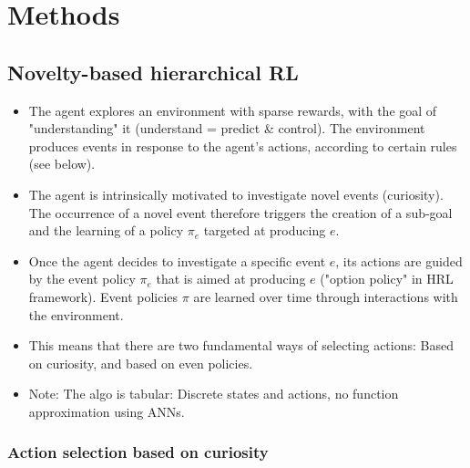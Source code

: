 \documentclass{article}
\begin{document}
\section{Methods}

\subsection{Novelty-based hierarchical RL}

\begin{itemize}
	\item The agent explores an environment with sparse rewards, with the goal of "understanding" it (understand = predict \& control). The environment produces events in response to the agent's actions, according to certain rules (see below).
	\item The agent is intrinsically motivated to investigate novel events (curiosity). The occurrence of a novel event therefore triggers the creation of a sub-goal and the learning of a policy $\pi_e$ targeted at producing $e$. 
	\item Once the agent decides to investigate a specific event $e$, its actions are guided by the event policy $\pi_e$ that is aimed at producing $e$ ("option policy" in HRL framework). Event policies $\pi$ are learned over time through interactions with the environment.
	\item This means that there are two fundamental ways of selecting actions: Based on curiosity, and based on even policies.
	\item Note: The algo is tabular: Discrete states and actions, no function approximation using ANNs.
\end{itemize}

\subsubsection{Action selection based on curiosity}
\end{document}
